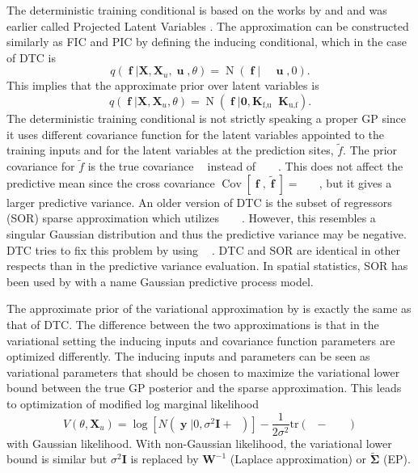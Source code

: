 \documentclass[twoside,11pt]{article}
\DeclareMathOperator{\Kfu}{\mathbf{K}_{f,u}}
\DeclareMathOperator{\Kuf}{\mathbf{K}_{u,f}}
\DeclareMathOperator{\Kff}{\mathbf{K}_{f,f}}
\DeclareMathOperator{\Kaa}{\mathbf{K}_{\tilde{f},\tilde{f}}}
\DeclareMathOperator{\iKuu}{\mathbf{K}_{u,u}^{-1}}
\DeclareMathOperator{\Kau}{\mathbf{K}_{\tilde{f},u}}
\DeclareMathOperator{\Kua}{\mathbf{K}_{u,\tilde{f}}}
\DeclareMathOperator{\Qff}{\mathbf{Q}_{f,f}}
\DeclareMathOperator{\f}{\mathbf{f}}
\DeclareMathOperator{\y}{\mathbf{y}}
\DeclareMathOperator{\uu}{\mathbf{u}}
\DeclareMathOperator{\N}{N}
\newcommand{\mb}{\mathbf}
\DeclareMathOperator{\COV}{Cov}
\begin{document}
The deterministic training conditional is based on the works by
\citet{Csato+Opper:2002} and \citet{Seeger+Williams+Lawrence:2003} and
was earlier called Projected Latent Variables \citep[see][for
more details]{Quinonero-Candela+Rasmussen:2005}. The approximation 
can be constructed similarly as FIC and PIC by defining the inducing
conditional, which in the case of DTC is 
%
\begin{equation}
q(\f | \mb{X}, \mb{X}_{u}, \uu, \theta) = \N(\f|\Kfu \iKuu\uu,0).
\end{equation}
%
This implies that the approximate prior over latent variables is
%
\begin{equation}
  q(\f | \mb{X}, \mb{X}_{u}, \theta) = \N(\f | \mb{0}, \mb{K}_{\text{f,u}} \iKuu\mb{K}_{\text{u,f}}).
\label{GP_DTC_prior}
\end{equation}
%
The deterministic training conditional is not strictly speaking a
proper GP since it uses different covariance function for the latent
variables appointed to the training inputs and for the latent
variables at the prediction sites, $\tilde{f}$. The prior covariance
for $\tilde{f}$ is the true covariance $\Kaa$ instead of
$\Kau\iKuu\Kua$. This does not affect the predictive mean since the
cross covariance $\COV[\f,\tilde{\f}] = \Kfu\iKuu\Kua$, but it gives a
larger predictive variance. An older version of DTC is the subset of
regressors (SOR) sparse approximation which utilizes $\Kau\iKuu\Kua$.
However, this resembles a singular Gaussian distribution and thus the
predictive variance may be negative. DTC tries to fix this problem by
using $\Kaa$ \citep[see][]{Quinonero-Candela+Rasmussen:2005}. DTC and
SOR are identical in other respects than in the predictive variance
evaluation. In spatial statistics, SOR has been used by
\citet{Banerjee+Gelfand+Finley+Sang:2008} with a name Gaussian
predictive process model.

The approximate prior of the variational approximation by
\citet{Titsias:2009} is exactly the same as that of DTC. The
difference between the two approximations is that in the variational
setting the inducing inputs and covariance function parameters are
optimized differently. The inducing inputs and parameters can be seen
as variational parameters that should be chosen to maximize the
variational lower bound between the true GP posterior and the sparse
approximation. This leads to optimization of modified log marginal
likelihood
%
\begin{equation}
V(\theta, \mb{X}_u) = \log [N(\y|0, \sigma^2\mb{I} + \Qff) ] -
\frac{1}{2\sigma^2} \text{tr}(\Kff - \Kfu\iKuu\Kuf)
\end{equation}
%
with Gaussian likelihood. With non-Gaussian likelihood, the
variational lower bound is similar but $\sigma^2\mb{I}$ is replaced by
$\mb{W}^{-1}$ (Laplace approximation) or $\tilde{\mb{\Sigma}}$ (EP).
\end{document}

